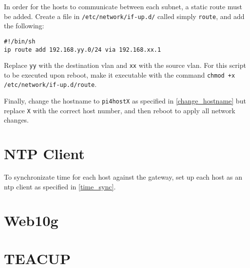 In order for the hosts to communicate between each subnet, a static route must be added. Create a file in \lstinline{/etc/network/if-up.d/} called simply \lstinline{route}, and add the following:

\begin{lstlisting}
#!/bin/sh
ip route add 192.168.yy.0/24 via 192.168.xx.1
\end{lstlisting}

Replace \lstinline{yy} with the destination \gls{vlan} and \lstinline{xx} with the source \gls{vlan}. For this script to be executed upon reboot, make it executable with the command \lstinline{chmod +x /etc/network/if-up.d/route}.

Finally, change the hostname to \lstinline{pi4hostX} as specified in \ref{change_hostname} but replace \lstinline{X} with the correct host number, and then reboot to apply all network changes.


\section{NTP Client}

To synchronizate time for each host against the gateway, set up each host as an \gls{ntp} client as specified in \ref{time_sync}.

\section{Web10g}



\section{TEACUP}

